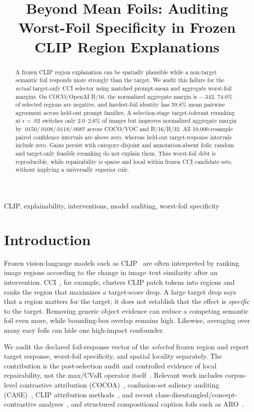 \documentclass[10pt]{article}
\title{Beyond Mean Foils: Auditing Worst-Foil Specificity in Frozen CLIP Region Explanations}
\begin{document}
\maketitle

\begin{abstract}
A frozen CLIP region explanation can be spatially plausible while a non-target
semantic foil responds more strongly than the target. We audit this failure for
the \emph{actual} target-only CCI selector using matched prompt-mean and aggregate
worst-foil margins. On COCO/OpenAI B/16, the normalized aggregate margin is
$-.342$, 74.0\% of selected regions are negative, and hardest-foil identity has
59.8\% mean pairwise agreement across held-out prompt families. A selection-stage
target-tolerant reranking at $\epsilon=.02$ switches only 2.0--2.6\% of images but
improves normalized aggregate margin by $.0150/.0108/.0118/.0087$ across COCO/VOC
and B/16/B/32. All 10,000-resample paired confidence intervals are above zero,
whereas held-out target-response intervals include zero. Gains persist with
category-disjoint and annotation-absent foils; random and target-only feasible
reranking do not explain them. Thus worst-foil debt is reproducible, while
repairability is sparse and local within frozen CCI candidate sets, without
implying a universally superior rule.
\end{abstract}
\begin{keywords}
CLIP, explainability, interventions, model auditing, worst-foil specificity
\end{keywords}

\section{Introduction}
Frozen vision-language models such as CLIP~\cite{radford2021clip} are often interpreted by ranking image regions
according to the change in image--text similarity after an intervention.
CCI~\cite{agarwal2025cci}, for example, clusters CLIP patch tokens into regions
and ranks the region that maximizes a target-score drop. A large target drop says
that a region matters for the target; it does not establish that the effect is
\emph{specific} to the target. Removing generic object evidence can reduce a
competing semantic foil even more, while bounding-box overlap remains high.
Likewise, averaging over many easy foils can hide one high-impact confounder.

We audit the declared foil-response vector of the \emph{selected} frozen
region and report target response, worst-foil specificity, and spatial locality
separately. The contribution is the post-selection audit and controlled evidence
of local repairability, not the max/CVaR operator itself~\cite{rockafellar2000cvar}.
Relevant work includes corpus-level contrastive attribution (COCOA)~\cite{lin2023cocoa},
confusion-set saliency auditing (CASE)~\cite{williamson2025case}, CLIP attribution
methods~\cite{wang2023m2ib,li2023clipsurgery,dreyer2025cliplatent}, and recent
class-disentangled/concept-contrastive analyses~\cite{li2026cdaclip,cheng2026mgaclip,visser2026contrastiveconcept}, and structured compositional caption foils such as ARO~\cite{yuksekgonul2023aro}.
\end{document}
